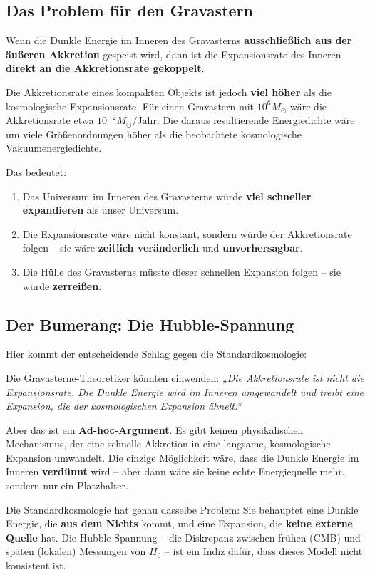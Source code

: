 \documentclass[12pt,a4paper]{article}
\begin{document}
\subsection{Das Problem für den Gravastern}

Wenn die Dunkle Energie im Inneren des Gravasterns \textbf{ausschließlich aus der äußeren Akkretion} gespeist wird, dann ist die Expansionsrate des Inneren \textbf{direkt an die Akkretionsrate gekoppelt}.

Die Akkretionsrate eines kompakten Objekts ist jedoch \textbf{viel höher} als die kosmologische Expansionsrate. Für einen Gravastern mit $10^6 M_\odot$ wäre die Akkretionsrate etwa $10^{-2} M_\odot/\text{Jahr}$. Die daraus resultierende Energiedichte wäre um viele Größenordnungen höher als die beobachtete kosmologische Vakuumenergiedichte.

Das bedeutet:
\begin{enumerate}
    \item Das Universum im Inneren des Gravasterns würde \textbf{viel schneller expandieren} als unser Universum.
    \item Die Expansionsrate wäre nicht konstant, sondern würde der Akkretionsrate folgen – sie wäre \textbf{zeitlich veränderlich} und \textbf{unvorhersagbar}.
    \item Die Hülle des Gravasterns müsste dieser schnellen Expansion folgen – sie würde \textbf{zerreißen}.
\end{enumerate}

\subsection{Der Bumerang: Die Hubble-Spannung}

Hier kommt der entscheidende Schlag gegen die Standardkosmologie:

Die Gravasterne-Theoretiker könnten einwenden: \textit{„Die Akkretionsrate ist nicht die Expansionsrate. Die Dunkle Energie wird im Inneren umgewandelt und treibt eine Expansion, die der kosmologischen Expansion ähnelt.“}

Aber das ist ein \textbf{Ad-hoc-Argument}. Es gibt keinen physikalischen Mechanismus, der eine schnelle Akkretion in eine langsame, kosmologische Expansion umwandelt. Die einzige Möglichkeit wäre, dass die Dunkle Energie im Inneren \textbf{verdünnt} wird – aber dann wäre sie keine echte Energiequelle mehr, sondern nur ein Platzhalter.

Die Standardkosmologie hat genau dasselbe Problem: Sie behauptet eine Dunkle Energie, die \textbf{aus dem Nichts} kommt, und eine Expansion, die \textbf{keine externe Quelle} hat. Die Hubble-Spannung – die Diskrepanz zwischen frühen (CMB) und späten (lokalen) Messungen von $H_0$ – ist ein Indiz dafür, dass dieses Modell nicht konsistent ist.
\end{document}

